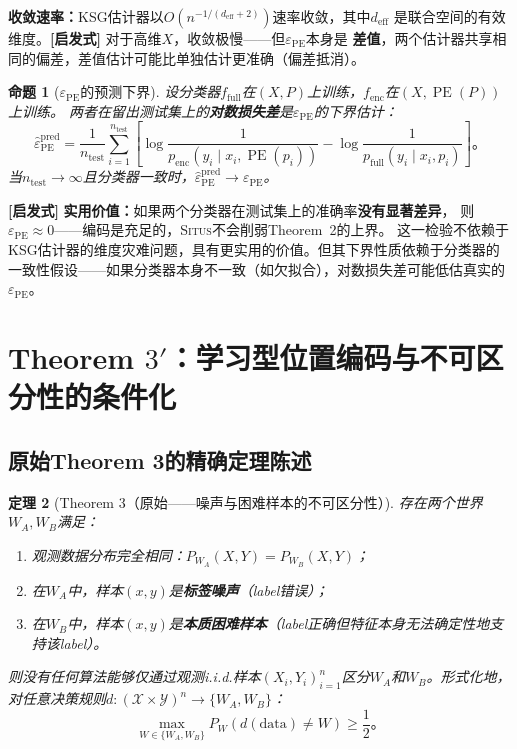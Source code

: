 \documentclass[11pt,a4paper]{article}
\newtheorem{theorem}{定理}[section]
\newtheorem{proposition}[theorem]{命题}
\theoremstyle{remark}
\DeclareMathOperator{\PE}{PE}
\newcommand{\Y}{\mathcal{Y}}
\newcommand{\X}{\mathcal{X}}
\newcommand{\Situs}{\textsc{Situs}}
\newcommand{\heuristic}{\textnormal{\textbf{[启发式]}}}
\begin{document}
\textbf{收敛速率：}KSG估计器以$O(n^{-1/(d_{\text{eff}}+2)})$速率收敛，其中$d_{\text{eff}}$
是联合空间的有效维度。\heuristic{} 对于高维$X$，收敛极慢——但$\varepsilon_{\PE}$本身是
\textbf{差值}，两个估计器共享相同的偏差，差值估计可能比单独估计更准确（偏差抵消）。

\begin{proposition}[$\varepsilon_{\PE}$的预测下界]
\label{prop:3.3.1}
设分类器$f_{\text{full}}$在$(X, P)$上训练，$f_{\text{enc}}$在$(X, \PE(P))$上训练。
两者在留出测试集上的\textbf{对数损失差}是$\varepsilon_{\PE}$的下界估计：
\begin{equation}
    \boxed{
    \hat{\varepsilon}_{\PE}^{\text{pred}} = \frac{1}{n_{\text{test}}}
    \sum_{i=1}^{n_{\text{test}}}
    \left[\log\frac{1}{p_{\text{enc}}(y_i \mid x_i, \PE(p_i))}
        - \log\frac{1}{p_{\text{full}}(y_i \mid x_i, p_i)}\right]
    }。
\end{equation}
当$n_{\text{test}} \to \infty$且分类器一致时，$\hat{\varepsilon}_{\PE}^{\text{pred}} \to \varepsilon_{\PE}$。
\end{proposition}

\heuristic{} \textbf{实用价值：}如果两个分类器在测试集上的准确率\textbf{没有显著差异}，
则$\varepsilon_{\PE} \approx 0$——编码是充足的，\Situs{}不会削弱Theorem~2的上界。
这一检验不依赖于KSG估计器的维度灾难问题，具有更实用的价值。但其下界性质依赖于分类器的
一致性假设——如果分类器本身不一致（如欠拟合），对数损失差可能低估真实的$\varepsilon_{\PE}$。

\section{Theorem $3'$：学习型位置编码与不可区分性的条件化}

\subsection{原始Theorem 3的精确定理陈述}

\begin{theorem}[Theorem 3（原始——噪声与困难样本的不可区分性）]
\label{thm:3_original}
存在两个世界$W_A, W_B$满足：
\begin{enumerate}[label=(\arabic*)]
    \item 观测数据分布完全相同：$P_{W_A}(X, Y) = P_{W_B}(X, Y)$；
    \item 在$W_A$中，样本$(x, y)$是\textbf{标签噪声}（label错误）；
    \item 在$W_B$中，样本$(x, y)$是\textbf{本质困难样本}（label正确但特征本身无法确定性地支持该label）。
\end{enumerate}
则没有任何算法能够仅通过观测i.i.d.样本$(X_i, Y_i)_{i=1}^n$区分$W_A$和$W_B$。形式化地，
对任意决策规则$d: (\X \times \Y)^n \to \{W_A, W_B\}$：
\begin{equation}
    \max_{W \in \{W_A, W_B\}} P_W(d(\text{data}) \neq W) \geq \frac{1}{2}。
\end{equation}
\end{theorem}
\end{document}
